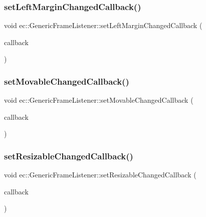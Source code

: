 \subsubsection{\texorpdfstring{set\+Left\+Margin\+Changed\+Callback()}{setLeftMarginChangedCallback()}}
{\footnotesize\ttfamily void ec\+::\+Generic\+Frame\+Listener\+::set\+Left\+Margin\+Changed\+Callback (\begin{DoxyParamCaption}\item[{const \mbox{\hyperlink{classec_1_1_generic_frame_listener_aca4694f1cf253669d8cd51045de4be46}{Left\+Margin\+Changed\+\_\+\+Callback}} \&}]{callback }\end{DoxyParamCaption})}

\mbox{\label{classec_1_1_generic_frame_listener_a98796b79c329edbf251f1186af2381ed}} 
\subsubsection{\texorpdfstring{set\+Movable\+Changed\+Callback()}{setMovableChangedCallback()}}
{\footnotesize\ttfamily void ec\+::\+Generic\+Frame\+Listener\+::set\+Movable\+Changed\+Callback (\begin{DoxyParamCaption}\item[{const \mbox{\hyperlink{classec_1_1_generic_frame_listener_a4ed5abe7907c3c2e367e8a6f1a2b01ac}{Movable\+Changed\+\_\+\+Callback}} \&}]{callback }\end{DoxyParamCaption})}

\mbox{\label{classec_1_1_generic_frame_listener_a062cd0fc0c81cd1d873ce89fdee61131}} 
\subsubsection{\texorpdfstring{set\+Resizable\+Changed\+Callback()}{setResizableChangedCallback()}}
{\footnotesize\ttfamily void ec\+::\+Generic\+Frame\+Listener\+::set\+Resizable\+Changed\+Callback (\begin{DoxyParamCaption}\item[{const \mbox{\hyperlink{classec_1_1_generic_frame_listener_a726ee9bf39ca67b4fe60a1a0cc038058}{Resizable\+Changed\+\_\+\+Callback}} \&}]{callback }\end{DoxyParamCaption})}

